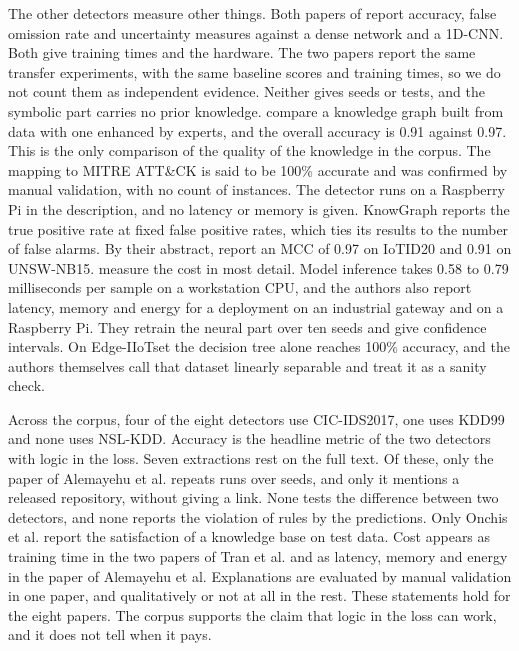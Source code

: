 The other detectors measure other things. Both papers of
\citet{tran2025odxu,tran2025transfer} report accuracy, false omission rate and
uncertainty measures against a dense network and a 1D-CNN. Both give
training times and the hardware. The two papers report the same transfer
experiments, with the same baseline scores and training times, so we do not
count them as independent evidence. Neither gives seeds or tests, and the
symbolic part carries no prior knowledge. \citet{kalutharage2025neurosymbolic}
compare a knowledge graph built from data with one enhanced by experts, and the
overall accuracy is 0.91 against 0.97. This is the only comparison of the
quality of the knowledge in the corpus. The mapping to MITRE ATT\&CK is said to
be 100\% accurate and was confirmed by manual validation, with no count of
instances. The detector runs on a Raspberry Pi in the description, and no latency
or memory is given. KnowGraph reports the true positive rate at fixed false
positive rates, which ties its results to the number of false alarms. By their abstract,
\citet{aresrobledo2025hyperparameter} report an MCC of 0.97 on IoTID20 and 0.91 on
UNSW-NB15. \citet{alemayehu2026deployment} measure the cost in most detail. Model
inference takes 0.58 to 0.79 milliseconds per sample on a workstation CPU, and
the authors also report latency, memory and energy for a deployment on an
industrial gateway and on a Raspberry Pi. They retrain the neural part over ten seeds and give
confidence intervals. On Edge-IIoTset the decision tree alone reaches 100\%
accuracy, and the authors themselves call that dataset linearly separable and
treat it as a sanity check.

Across the corpus, four of the eight detectors use CIC-IDS2017, one uses KDD99
and none uses NSL-KDD. Accuracy is the headline metric of the two detectors with
logic in the loss. Seven extractions rest on the full text. Of these, only the
paper of Alemayehu et al. repeats runs over seeds, and only it mentions a
released repository, without giving a link. None tests the difference between
two detectors, and none reports the violation of rules by the predictions. Only
Onchis et al. report the satisfaction of a knowledge base on test data. Cost
appears as training time in the two papers of Tran et al. and as latency,
memory and energy in the paper of Alemayehu et al. Explanations are evaluated by
manual validation in one paper, and qualitatively or not at all in the rest. These statements hold for
the eight papers. The corpus supports the claim that logic in the loss can work,
and it does not tell when it pays.

